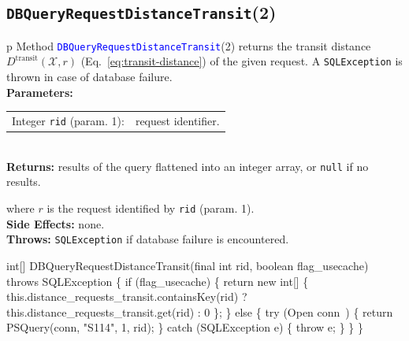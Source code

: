 \subsection{\texttt{DBQueryRequestDistanceTransit}(2)}
\begin{tabular}{p{\textwidth}}
\toprule
{}
Method \textcolor{blue}{{\tt{}\protect{}DBQueryRequestDistanceTransit}}(2) returns the
transit distance $D^\textrm{transit}(\mathcal{X},r)$
(Eq.~\ref{eq:transit-distance}) of the given request.
A {\tt{}SQLException} is thrown in case of database failure.\\
\midrule
\textbf{Parameters:}\\
\begin{tabular}{lp{116mm}}
Integer {\tt{}rid} (param. 1):&request identifier.
\end{tabular}\\
\textbf{Returns:} results of the query flattened into an integer array,
or {\tt{}null} if no results.


where $r$ is the request identified by {\tt{}rid} (param. 1).\\
\textbf{Side Effects:} none.\\
\textbf{Throws:} {\tt{}SQLException} if database failure is encountered.\\
\bottomrule
\end{tabular}
\nwenddocs{}\endmoddef{}
int[] DBQueryRequestDistanceTransit(final int rid, boolean flag_usecache) throws SQLException \{
  if (flag_usecache) \{
    return new int[] \{ this.distance_requests_transit.containsKey(rid)
      ? this.distance_requests_transit.get(rid)
      : 0 \};
  \} else \{
    try (\LA{}Open \code{}conn\edoc{}~{\nwtagstyle{}}\RA{}) \{
      return PSQuery(conn, "S114", 1, rid);
    \} catch (SQLException e) \{
      throw e;
    \}
  \}
\}
\eatline
{}\nwendcode{}\nwdocspar
